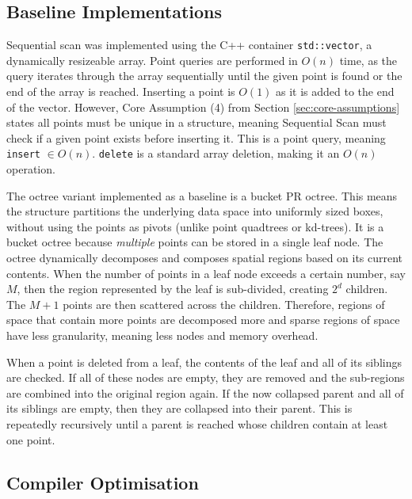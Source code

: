 \subsection{Baseline Implementations}
 
Sequential scan was implemented using the C++ container \texttt{std::vector}, a dynamically resizeable array.  Point queries are performed in $O(n)$ time, as the query iterates through the array sequentially until the given point is found or the end of the array is reached. Inserting a point is $O(1)$ as it is added to the end of the vector. However, Core Assumption (4) from Section \ref{sec:core-assumptions} states all points must be unique in a structure, meaning Sequential Scan must check if a given point exists before inserting it. This is a point query, meaning \texttt{insert} $\in O(n)$. \texttt{delete} is a standard array deletion, making it an $O(n)$ operation.

The octree variant implemented as a baseline is a bucket PR octree. This means the structure partitions the underlying data space into uniformly sized boxes, without using the points as pivots (unlike point quadtrees or kd-trees). It is a bucket octree because \textit{multiple} points can be stored in a single leaf node. The octree dynamically decomposes and composes spatial regions based on its current contents. When the number of points in a leaf node exceeds a certain number, say $M$, then the region represented by the leaf is sub-divided, creating $2^d$ children. The $M + 1$ points are then scattered across the children. Therefore, regions of space that contain more points are decomposed more and sparse regions of space have less granularity, meaning less nodes and memory overhead.

When a point is deleted from a leaf, the contents of the leaf and all of its siblings are checked. If all of these nodes are empty, they are removed and the sub-regions are combined into the original region again. If the now collapsed parent and all of its siblings are empty, then they are collapsed into their parent. This is repeatedly recursively until a parent is reached whose children contain at least one point.

\subsection{Compiler Optimisation}

